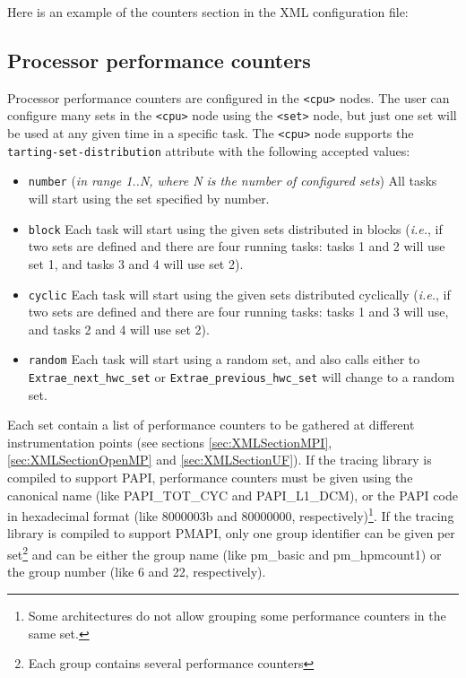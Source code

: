 Here is an example of the counters section in the XML configuration file:




\subsection{Processor performance counters}\label{subsec:ProcessorPerformanceCounters}

Processor performance counters are configured in the {\tt <cpu>} nodes. The user can configure many sets in the {\tt <cpu>} node using the {\tt <set>} node, but just one set will be used at any given time in a specific task. The {\tt <cpu>} node supports the {\tt tarting-set-distribution} attribute with the following accepted values:

\begin{itemize}
 \item {\tt number} ({\em in range 1..N, where N is the number of configured sets}) All tasks will start using the set specified by number.
 \item {\tt block} Each task will start using the given sets distributed in blocks ({\em i.e.}, if two sets are defined and there are four running tasks: tasks 1 and 2 will use set 1, and tasks 3 and 4 will use set 2).
 \item {\tt cyclic} Each task will start using the given sets distributed cyclically ({\em i.e.}, if two sets are defined and there are four running tasks: tasks 1 and 3 will use, and tasks 2 and 4 will use set 2).
 \item {\tt random} Each task will start using a random set, and also calls either to {\tt Extrae\_next\_hwc\_set} or {\tt Extrae\_previous\_hwc\_set} will change to a random set.
\end{itemize}

Each set contain a list of performance counters to be gathered at different instrumentation points (see sections \ref{sec:XMLSectionMPI}, \ref{sec:XMLSectionOpenMP} and \ref{sec:XMLSectionUF}). If the tracing library is compiled to support PAPI, performance counters must be given using the canonical name (like PAPI\_TOT\_CYC and PAPI\_L1\_DCM), or the PAPI code in hexadecimal format (like 8000003b and 80000000, respectively)\footnote{Some architectures do not allow grouping some performance counters in the same set.}. If the tracing library is compiled to support PMAPI, only one group identifier can be given per set\footnote{Each group contains several performance counters} and can be either the group name (like pm\_basic and pm\_hpmcount1) or the group number (like 6 and 22, respectively). 

